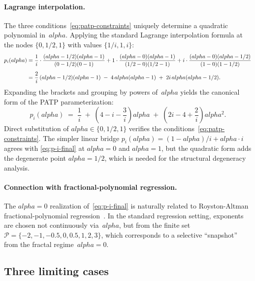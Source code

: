 \documentclass[11pt]{article}
\def\alpha{alpha}%
\def\tfrac#1#2{#1/#2}%
\theoremstyle{definition}
\begin{document}
\paragraph{Lagrange interpolation.}
The three conditions~\eqref{eq:patp-constraints} uniquely determine a
quadratic polynomial in~$\alpha$. Applying the standard Lagrange
interpolation formula at the nodes $\{0, \tfrac{1}{2}, 1\}$ with values
$\{1/i, 1, i\}$:
\begin{align}
  p_i(\alpha)
  &= \frac{1}{i}\cdot
     \frac{(\alpha - \tfrac{1}{2})(\alpha - 1)}{(0 - \tfrac{1}{2})(0 - 1)}
   + 1 \cdot
     \frac{(\alpha - 0)(\alpha - 1)}{(\tfrac{1}{2} - 0)(\tfrac{1}{2} - 1)}
   + i \cdot
     \frac{(\alpha - 0)(\alpha - \tfrac{1}{2})}{(1 - 0)(1 - \tfrac{1}{2})}
   \notag\\[1ex]
  &= \frac{2}{i}\,(\alpha - \tfrac{1}{2})(\alpha - 1)
     \;-\; 4\,\alpha(\alpha - 1)
     \;+\; 2i\,\alpha(\alpha - \tfrac{1}{2}).
   \label{eq:p-i-lagrange}
\end{align}
Expanding the brackets and grouping by powers of~$\alpha$ yields the
canonical form of the PATP parameterization:
\begin{equation}\label{eq:p-i-final}
  \boxed{\,
  p_i(\alpha)
  \;=\; \frac{1}{i}
        \;+\; \left(4 - i - \frac{3}{i}\right)\alpha
        \;+\; \left(2i - 4 + \frac{2}{i}\right)\alpha^{2}.
  \,}
\end{equation}
Direct substitution of $\alpha \in \{0, \tfrac{1}{2}, 1\}$ verifies the
conditions~\eqref{eq:patp-constraints}. The simpler linear bridge
$p_i(\alpha) = (1 - \alpha)/i + \alpha\cdot i$ agrees with
\eqref{eq:p-i-final} at $\alpha = 0$ and $\alpha = 1$, but the quadratic
form adds the degenerate point $\alpha = \tfrac{1}{2}$, which is needed for
the structural degeneracy analysis.

\paragraph{Connection with fractional-polynomial regression.}
The $\alpha = 0$ realization of~\eqref{eq:p-i-final} is naturally related to
Royston-Altman fractional-polynomial regression~\citep{royston1994}. In the
standard regression setting, exponents are chosen not continuously
via~$\alpha$, but from the finite set
$\mathcal{P} = \{-2, -1, -0.5, 0, 0.5, 1, 2, 3\}$, which corresponds to
a selective ``snapshot'' from the fractal regime~$\alpha = 0$.

\subsection{Three limiting cases}\label{sec:patp:limits}
\end{document}
